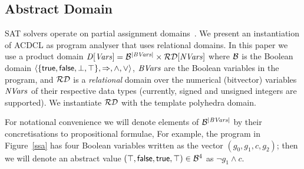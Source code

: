 
\subsection{Abstract Domain}
SAT solvers operate on partial assignment domains~\cite{sas12,dhk2013-popl}.  
We present an instantiation of ACDCL as program analyser that uses relational
domains.  
% 
In this paper we use a product domain $\mathit{D}[\mathit{Vars}]=\mathcal{B}^{|\mathit{BVars}|}\times\mathcal{RD}[\mathit{NVars}]$ where
$\mathcal{B}$ is the Boolean domain
$\langle\{\mathsf{true},\mathsf{false},\bot,\top\},\Rightarrow,\wedge,\vee\rangle$, 
$\mathit{BVars}$ are the Boolean variables in the program, 
and $\mathcal{RD}$ is a \emph{relational} domain over the 
numerical (bitvector) variables $\mathit{NVars}$ of their respective
data types (currently, signed and unsigned integers are supported).
%
We instantiate $\mathcal{RD}$ with the template polyhedra domain.

For notational convenience we will denote elements of
$\mathcal{B}^{|\mathit{BVars}|}$ by their concretisations to propositional formulae,
For example, the program in Figure~\ref{ssa} has four Boolean variables
written as the vector $(g_0,g_1,c,g_2)$; then we will denote an abstract value $(\top, \mathsf{false}, \mathsf{true}, \top) \in \mathcal{B}^4$ as $\neg g_1 \wedge c$.

